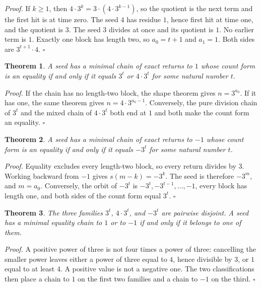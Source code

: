 \documentclass[11pt,letterpaper]{article}
\newtheorem{theorem}{Theorem}
\newenvironment{proof}{\noindent\textit{Proof.}}{\hfill\(\square\)}
\begin{document}
\begin{proof}
If \(k\ge 1\), then \(4\cdot 3^{k}=3\cdot(4\cdot 3^{k-1})\), so the quotient is the next term and the first hit is at time zero. The seed \(4\) has residue \(1\), hence first hit at time one, and the quotient is \(3\). The seed \(3\) divides at once and its quotient is \(1\). No earlier term is \(1\). Exactly one block has length two, so \(a_{0}=t+1\) and \(a_{1}=1\). Both sides are \(3^{t+1}\cdot 4\).
\end{proof}

\begin{theorem}
\label{thm:classify}
A seed has a minimal chain of exact returns to \(1\) whose count form is an equality if and only if it equals \(3^{t}\) or \(4\cdot 3^{t}\) for some natural number \(t\).
\end{theorem}

\begin{proof}
If the chain has no length-two block, the shape theorem gives \(n=3^{a_{0}}\). If it has one, the same theorem gives \(n=4\cdot 3^{a_{0}-1}\). Conversely, the pure division chain of \(3^{t}\) and the mixed chain of \(4\cdot 3^{t}\) both end at \(1\) and both make the count form an equality.
\end{proof}

\begin{theorem}
\label{thm:classifyneg}
A seed has a minimal chain of exact returns to \(-1\) whose count form is an equality if and only if it equals \(-3^{t}\) for some natural number \(t\).
\end{theorem}

\begin{proof}
Equality excludes every length-two block, so every return divides by \(3\). Working backward from \(-1\) gives \(s(m-k)=-3^{k}\). The seed is therefore \(-3^{m}\), and \(m=a_{0}\). Conversely, the orbit of \(-3^{t}\) is \(-3^{t},-3^{t-1},\ldots,-1\), every block has length one, and both sides of the count form equal \(3^{t}\).
\end{proof}

\begin{theorem}
\label{thm:basins}
The three families \(3^{t}\), \(4\cdot 3^{t}\), and \(-3^{t}\) are pairwise disjoint. A seed has a minimal equality chain to \(1\) or to \(-1\) if and only if it belongs to one of them.
\end{theorem}

\begin{proof}
A positive power of three is not four times a power of three: cancelling the smaller power leaves either a power of three equal to \(4\), hence divisible by \(3\), or \(1\) equal to at least \(4\). A positive value is not a negative one. The two classifications then place a chain to \(1\) on the first two families and a chain to \(-1\) on the third.
\end{proof}
\end{document}
